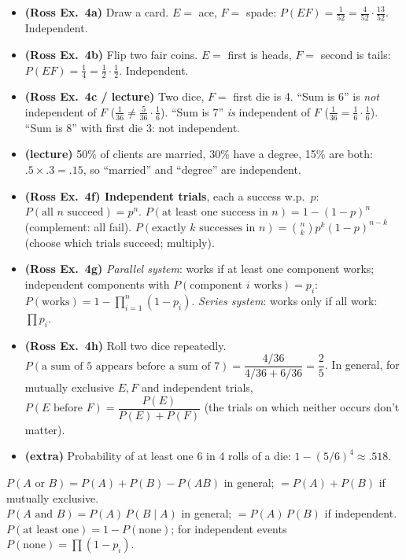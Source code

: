 \documentclass[11pt]{article}
\begin{document}
\begin{exbox}[Examples]
\begin{itemize}
\item \textbf{(Ross Ex.\ 4a)} Draw a card. $E=$ ace, $F=$ spade: $P(EF)=\tfrac1{52}=\tfrac4{52}\cdot\tfrac{13}{52}$. Independent.
\item \textbf{(Ross Ex.\ 4b)} Flip two fair coins. $E=$ first is heads, $F=$ second is tails: $P(EF)=\tfrac14=\tfrac12\cdot\tfrac12$. Independent.
\item \textbf{(Ross Ex.\ 4c / lecture)} Two dice, $F=$ first die is 4. ``Sum is 6'' is \emph{not} independent of $F$ ($\tfrac1{36}\ne\tfrac5{36}\cdot\tfrac16$). ``Sum is 7'' \emph{is} independent of $F$ ($\tfrac1{36}=\tfrac16\cdot\tfrac16$). ``Sum is 8'' with first die 3: not independent.
\item \textbf{(lecture)} 50\% of clients are married, 30\% have a degree, 15\% are both: $.5\times.3=.15$, so ``married'' and ``degree'' are independent.
\item \textbf{(Ross Ex.\ 4f) Independent trials}, each a success w.p.\ $p$: $P(\text{all }n\text{ succeed})=p^n$. $P(\text{at least one success in }n)=1-(1-p)^n$ (complement: all fail). $P(\text{exactly }k\text{ successes in }n)=\binom nkp^k(1-p)^{n-k}$ (choose which trials succeed; multiply).
\item \textbf{(Ross Ex.\ 4g)} \emph{Parallel system}: works if at least one component works; independent components with $P(\text{component }i\text{ works})=p_i$: $P(\text{works})=1-\prod_{i=1}^n(1-p_i)$. \emph{Series system}: works only if all work: $\prod p_i$.
\item \textbf{(Ross Ex.\ 4h)} Roll two dice repeatedly. $P(\text{a sum of 5 appears before a sum of 7})=\dfrac{4/36}{4/36+6/36}=\dfrac25$. In general, for mutually exclusive $E,F$ and independent trials, $P(E\text{ before }F)=\dfrac{P(E)}{P(E)+P(F)}$ (the trials on which neither occurs don't matter).
\item \textbf{(extra)} Probability of at least one 6 in 4 rolls of a die: $1-(5/6)^4\approx.518$.
\end{itemize}
\end{exbox}

\begin{defbox}
$P(A\text{ or }B)=P(A)+P(B)-P(AB)$ in general; $=P(A)+P(B)$ if mutually exclusive.\\
$P(A\text{ and }B)=P(A)\,P(B\mid A)$ in general; $=P(A)\,P(B)$ if independent.\\
$P(\text{at least one})=1-P(\text{none})$; for independent events $P(\text{none})=\prod(1-p_i)$.
\end{defbox}
\end{document}
